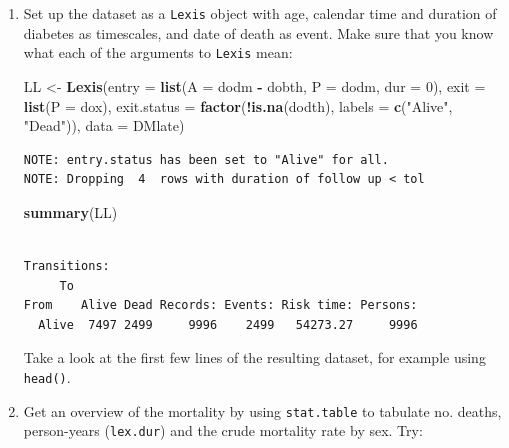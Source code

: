 \documentclass[
]{book}
\newenvironment{Shaded}{\begin{snugshade}}{\end{snugshade}}
\newcommand{\AttributeTok}[1]{\textcolor[rgb]{0.13,0.29,0.53}{#1}}
\newcommand{\DecValTok}[1]{\textcolor[rgb]{0.00,0.00,0.81}{#1}}
\newcommand{\FunctionTok}[1]{\textcolor[rgb]{0.13,0.29,0.53}{\textbf{#1}}}
\newcommand{\NormalTok}[1]{#1}
\newcommand{\OtherTok}[1]{\textcolor[rgb]{0.56,0.35,0.01}{#1}}
\newcommand{\SpecialCharTok}[1]{\textcolor[rgb]{0.81,0.36,0.00}{\textbf{#1}}}
\newcommand{\StringTok}[1]{\textcolor[rgb]{0.31,0.60,0.02}{#1}}
\theoremstyle{definition}
\theoremstyle{definition}
\theoremstyle{definition}
\theoremstyle{definition}
\theoremstyle{remark}
\begin{document}
\begin{enumerate}
\def\labelenumi{\arabic{enumi}.}
\item
  Set up the dataset as a \texttt{Lexis} object with age, calendar
  time and duration of diabetes as timescales, and date of death as
  event. Make sure that you know what each of the arguments to
  \texttt{Lexis} mean:

\begin{Shaded}
\begin{Highlighting}[]
\NormalTok{LL }\OtherTok{\textless{}{-}} \FunctionTok{Lexis}\NormalTok{(}\AttributeTok{entry =} \FunctionTok{list}\NormalTok{(}\AttributeTok{A =}\NormalTok{ dodm }\SpecialCharTok{{-}}\NormalTok{ dobth,}
                         \AttributeTok{P =}\NormalTok{ dodm,}
                       \AttributeTok{dur =} \DecValTok{0}\NormalTok{),}
             \AttributeTok{exit =} \FunctionTok{list}\NormalTok{(}\AttributeTok{P =}\NormalTok{ dox),}
      \AttributeTok{exit.status =} \FunctionTok{factor}\NormalTok{(}\SpecialCharTok{!}\FunctionTok{is.na}\NormalTok{(dodth),}
                           \AttributeTok{labels =} \FunctionTok{c}\NormalTok{(}\StringTok{"Alive"}\NormalTok{, }\StringTok{"Dead"}\NormalTok{)),}
             \AttributeTok{data =}\NormalTok{ DMlate)}
\end{Highlighting}
\end{Shaded}

\begin{verbatim}
NOTE: entry.status has been set to "Alive" for all.
NOTE: Dropping  4  rows with duration of follow up < tol
\end{verbatim}

\begin{Shaded}
\begin{Highlighting}[]
\FunctionTok{summary}\NormalTok{(LL)}
\end{Highlighting}
\end{Shaded}

\begin{verbatim}

Transitions:
     To
From    Alive Dead Records: Events: Risk time: Persons:
  Alive  7497 2499     9996    2499   54273.27     9996
\end{verbatim}

  Take a look at the first few lines of the resulting dataset, for
  example using \texttt{head()}.
\item
  Get an overview of the mortality by using \texttt{stat.table}
  to tabulate no. deaths, person-years (\texttt{lex.dur}) and the
  crude mortality rate by sex. Try:


\end{enumerate}
\end{document}
